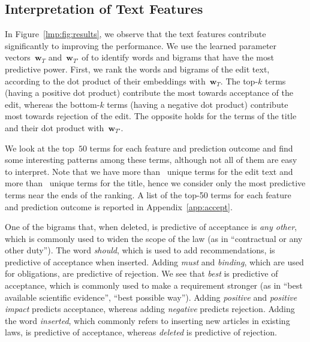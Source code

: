 \subsection{Interpretation of Text Features}
\label{lmp:sec:intertext}

In Figure~\ref{lmp:fig:results}, we observe that the text features contribute significantly to improving the performance.
We use the learned parameter vectors~$\boldsymbol{w}_T$ and~$\boldsymbol{w}_{T'}$ of  to identify words and bigrams that have the most predictive power.
First, we rank the words and bigrams of the edit text, according to the dot product of their embeddings with~$\boldsymbol{w}_T$.
The top-$k$ terms (having a positive dot product) contribute the most towards acceptance of the edit, whereas the bottom-$k$ terms (having a negative dot product) contribute most towards rejection of the edit.
The opposite holds for the terms of the title and their dot product with~$\boldsymbol{w}_{T'}$.

We look at the top~$50$ terms for each feature and prediction outcome and find some interesting patterns among these terms, although not all of them are easy to interpret.
Note that we have more than~ unique terms for the edit text and more than~ unique terms for the title, hence we consider only the most predictive terms near the ends of the ranking.
A list of the top-50 terms for each feature and prediction outcome is reported in Appendix~\ref{app:accept}.

One of the bigrams that, when deleted, is predictive of acceptance is \textit{any other}, which is commonly used to widen the scope of the law (as in ``contractual or any other duty'').
The word \textit{should}, which is used to add recommendations, is predictive of acceptance when inserted.
Adding \textit{must} and \textit{binding}, which are used for obligations, are predictive of rejection.
We see that \textit{best} is predictive of acceptance, which is commonly used to make a requirement stronger (as in ``best available scientific evidence'', ``best possible way'').
Adding \textit{positive} and \textit{positive impact} predicts acceptance, whereas adding \textit{negative} predicts rejection.
Adding the word \textit{inserted}, which commonly refers to inserting new articles in existing laws, is predictive of acceptance, whereas \textit{deleted} is predictive of rejection.

